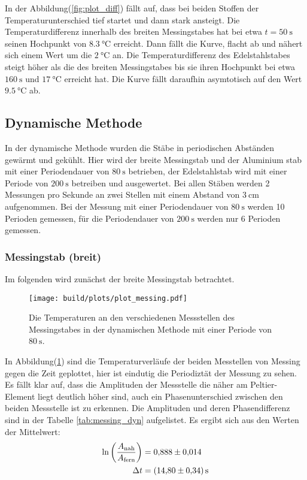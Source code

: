       \noindent In der Abbildung(\ref{fig:plot_diff}) fällt auf, dass bei beiden Stoffen der Temperaturunterschied tief startet und dann stark ansteigt.
      Die Temperaturdifferenz innerhalb des breiten Messingstabes hat bei etwa $ t = \SI{50}{\second}$ seinen Hochpunkt von $\SI{8.3}{\celsius}$ erreicht.
      Dann fällt die Kurve, flacht ab und nähert sich einem Wert um die $\SI{2}{\celsius}$ an.
      Die Temperaturdifferenz des Edelstahlstabes steigt höher als die des breiten Messingstabes bis sie ihren Hochpunkt 
      bei etwa $\SI{160}{\second} $ und $\SI{17}{\celsius}$ erreicht hat.
      Die Kurve fällt daraufhin asymtotisch auf den Wert $\SI{9.5}{\celsius}$ ab.

    \subsection{Dynamische Methode}

      \noindent In der dynamische Methode wurden die Stäbe in periodischen Abständen gewärmt und gekühlt. 
      Hier wird der breite Messingstab und der Aluminium stab mit einer Periodendauer von $\SI{80}{\second}$ betrieben, der Edelstahlstab wird 
      mit einer Periode von $\SI{200}{\second}$ betreiben und ausgewertet. Bei allen Stäben werden 2 Messungen pro Sekunde an zwei Stellen mit einem 
      Abstand von $\SI{3}{\centi\meter}$ aufgenommen. Bei der Messung mit einer Periodendauer von $\SI{80}{\second}$ werden 10 Perioden gemessen, 
      für die Periodendauer von $\SI{200}{\second}$ werden nur 6 Perioden gemessen.
        
      \subsubsection{Messingstab (breit)}

        \noindent Im folgenden wird zunächst der breite Messingstab betrachtet.

        \begin{figure}[ht]
          \centering
          \texttt{[image: build/plots/plot\_messing.pdf]}
          \caption{Die Temperaturen an den verschiedenen Messstellen des Messingstabes in der dynamischen Methode mit einer Periode von $\SI{80}{\second}$.}
          \label{fig:messing_dyn}
        \end{figure}

        \noindent In Abbildung(\ref{fig:messing_dyn}) sind die Temperaturverläufe der beiden Messtellen von Messing gegen die Zeit geplottet, hier ist 
        eindutig die Periodiztät der Messung zu sehen. Es fällt klar auf, dass die Amplituden der Messstelle die näher am Peltier-Element liegt 
        deutlich höher sind, auch ein Phasenunterschied zwischen den beiden Messstelle ist zu erkennen.
        Die Amplituden und deren Phasendifferenz sind in der Tabelle \ref{tab:messing_dyn} aufgelistet.
        Es ergibt sich aus den Werten der Mittelwert:
        \begin{align*}
          \ln\left( \frac{A_{\text{nah}}}{A_{\text{fern}}}\right) &= \num{0.888 \pm 0.014}\\
          \Delta t &= \SI{14.8 \pm 0.34}{\second}
        \end{align*} 

